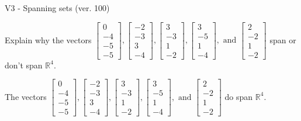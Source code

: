 \begin{exercise}
  \begin{exerciseTitle}V3 - Spanning sets (ver. 100)\end{exerciseTitle}
  \begin{exerciseStatement}
    Explain why the vectors \(\left[\begin{array}{r}
0 \\
-4 \\
-5 \\
-5
\end{array}\right] , \left[\begin{array}{r}
-2 \\
-3 \\
3 \\
-4
\end{array}\right] , \left[\begin{array}{r}
3 \\
-3 \\
1 \\
-2
\end{array}\right] , \left[\begin{array}{r}
3 \\
-5 \\
1 \\
-4
\end{array}\right] , \text{ and } \left[\begin{array}{r}
2 \\
-2 \\
1 \\
-2
\end{array}\right]\) span or don't span \(\mathbb{R}^4\). 
	


  \end{exerciseStatement}
  \begin{exerciseAnswer}
   The vectors \(\left[\begin{array}{r}
0 \\
-4 \\
-5 \\
-5
\end{array}\right] , \left[\begin{array}{r}
-2 \\
-3 \\
3 \\
-4
\end{array}\right] , \left[\begin{array}{r}
3 \\
-3 \\
1 \\
-2
\end{array}\right] , \left[\begin{array}{r}
3 \\
-5 \\
1 \\
-4
\end{array}\right] , \text{ and } \left[\begin{array}{r}
2 \\
-2 \\
1 \\
-2
\end{array}\right]\) 
  	 do  
	span \(\mathbb{R}^4\).
  



\end{exerciseAnswer}
\end{exercise}
